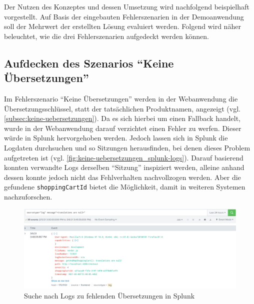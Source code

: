 
Der Nutzen des Konzeptes und dessen Umsetzung wird nachfolgend beispielhaft vorgestellt. Auf Basis der eingebauten Fehlerszenarien in der Demoanwendung soll der Mehrwert der erstellten Lösung evaluiert werden. Folgend wird näher beleuchtet, wie die drei Fehlerszenarien aufgedeckt werden können.

\subsection{Aufdecken des Szenarios \enquote{Keine Übersetzungen}}

Im Fehlerszenario \enquote{Keine Übersetzungen} werden in der Webanwendung die Übersetzungsschlüssel, statt der tatsächlichen Produktnamen, angezeigt (vgl. \autoref{subsec:keine-uebersetzungen}). Da es sich hierbei um einen Fallback handelt, wurde in der Webanwendung darauf verzichtet einen Fehler zu werfen. Dieser würde in Splunk hervorgehoben werden. Jedoch lassen sich in Splunk die Logdaten durchsuchen und so Sitzungen herausfinden, bei denen dieses Problem aufgetreten ist (vgl. \autoref{fig:keine-uebersetzungen_splunk-logs}). Darauf basierend konnten verwandte Logs derselben \enquote{Sitzung} inspiziert werden, alleine anhand dessen konnte jedoch nicht das Fehlverhalten nachvollzogen werden. Aber die gefundene \texttt{shoppingCartId} bietet die Möglichkeit, damit in weiteren Systemen nachzuforschen.

\begin{figure}[H]
	\centering
	\includegraphics[width=1.00\linewidth]{img/05_ergebnis/keine-uebersetzungen_splunk-logs.png}
	\caption{Suche nach Logs zu fehlenden Übersetzungen in Splunk}
	\label{fig:keine-uebersetzungen_splunk-logs}
\end{figure}

